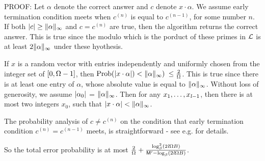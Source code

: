 PROOF:
Let $\alpha$ denote the correct answer and
$c$ denote $x \cdot \alpha$. 
We assume early termination condition meets when 
$c^{(n)}$ is equal to $c^{(n-1)}$, for some number $n$. 
If both $|c| \geq \|\alpha\|_\infty$ and
$c = c^{(n)}$ are true, then the algorithm returns the correct answer.
This is true since the modulo which is the porduct of these primes in $\mathcal L$ is at least 
$2 \|\alpha\|_\infty$ under these hyothesis.

If $x$ is a random vector with entries 
independently and uniformly chosen from the integer set of $[0, \Omega-1]$,
then $\mbox{Prob} (|x \cdot \alpha|) < \|\alpha\|_\infty)$
$\leq \frac{2}{\Omega}$.
This is true since
there is at least one entry of $\alpha$, whose absolute value is
equal to $\|\alpha\|_\infty$.
Without loss of generosity, we assume $|\alpha_0|$ = $\|\alpha\|_\infty$.
Then for any $x_1, \ldots, x_{\mathit l-1}$, then there is at most two integers $x_0$, 
such that $|x \cdot \alpha| < \|\alpha\|_\infty$.

The probability analysis of $c \not= c^{(n)}$ 
on the condition that early termination condition $c^{(n)} = c^{(n-1)}$ meets,
is straightforward - see e.g. \cite[Theorem 1.]{Kaltofen02} for details.

So the total error probability is at most 
$\frac{2}{\Omega} +
\frac{\log^2_{\beta}(2\mathit l \Omega B)}
{\mathsf M^\prime - \log_{\beta}(2\mathit l \Omega B)}$.
%
%
%
%
%
\QED
